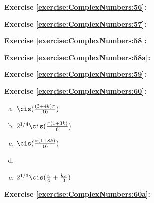 \noindent\textbf{Exercise \ref{exercise:ComplexNumbers:56}:}

\noindent\textbf{Exercise \ref{exercise:ComplexNumbers:57}:}

\noindent\textbf{Exercise \ref{exercise:ComplexNumbers:58}:}

\noindent\textbf{Exercise \ref{exercise:ComplexNumbers:58a}:}

\noindent\textbf{Exercise \ref{exercise:ComplexNumbers:59}:}

\noindent\textbf{Exercise \ref{exercise:ComplexNumbers:60}:} %
\begin{enumerate}[(a)]
\item
	$\cis(\frac{(3+4k)\pi }{10})$
\item
$2^{1/4} \cis (\frac{\pi(1+3k)}{6})$
\item
	$\cis(\frac{\pi(1+8k)}{16})$
\item
\item
$2^{1/3} \cis ( \frac{\pi}{4} + \frac{k\pi}{3} )$

\end{enumerate}

\noindent\textbf{Exercise \ref{exercise:ComplexNumbers:60a}:} 

